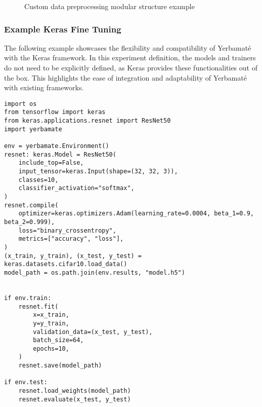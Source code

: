 \begin{figure}[H]
\centering
{}
\caption{
Custom data preprocessing modular structure example
}
\label{customdata}
\end{figure}

\subsubsection{Example Keras Fine Tuning}

The following example showcases the flexibility and compatibility of Yerbamaté with the Keras framework. In this experiment definition, the models and trainers do not need to be explicitly defined, as Keras provides these functionalities out of the box. This highlights the ease of integration and adaptability of Yerbamaté with existing frameworks.

\begin{verbatim}
import os
from tensorflow import keras
from keras.applications.resnet import ResNet50
import yerbamate

env = yerbamate.Environment()
resnet: keras.Model = ResNet50(
    include_top=False,
    input_tensor=keras.Input(shape=(32, 32, 3)),
    classes=10,
    classifier_activation="softmax",
)
resnet.compile(
    optimizer=keras.optimizers.Adam(learning_rate=0.0004, beta_1=0.9, beta_2=0.999),
    loss="binary_crossentropy",
    metrics=["accuracy", "loss"],
)
(x_train, y_train), (x_test, y_test) = keras.datasets.cifar10.load_data()
model_path = os.path.join(env.results, "model.h5")


if env.train:
    resnet.fit(
        x=x_train,
        y=y_train,
        validation_data=(x_test, y_test),
        batch_size=64,
        epochs=10,
    )
    resnet.save(model_path)

if env.test:
    resnet.load_weights(model_path)
    resnet.evaluate(x_test, y_test)

\end{verbatim}



